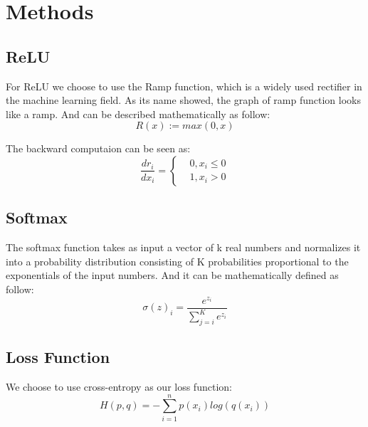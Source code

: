 \documentclass[12pt]{article}
\begin{document}
\section{Methods}
\subsection*{ReLU}
For ReLU we choose to use the Ramp function, which is a widely used rectifier in the machine 
learning field. As its name showed, the graph of ramp function looks like a ramp. And can be 
described mathematically as follow:
\begin{equation*}
    R(x):=max(0,x)
\end{equation*}

The backward computaion can be seen as:
\begin{equation*}
    \frac{dr_i}{dx_i}=\left\{
        \begin{aligned}
            &0, x_i\leq 0\\
            &1, x_i> 0
        \end{aligned}
    \right.
\end{equation*}

\subsection*{Softmax}
The softmax function takes as input a vector of k real numbers and normalizes it into a probability distribution consisting of K probabilities proportional to the exponentials of the input numbers.
And it can be mathematically defined as follow:
\begin{equation*}
    \sigma(z)_i = \frac{e^{z_i}}{\sum_{j=i}^K e^{z_i}}
\end{equation*}

\subsection*{Loss Function}
We choose to use cross-entropy as our loss function:
\begin{equation*}
    H(p,q) = -\sum_{i=1}^n p(x_i)log(q(x_i))
\end{equation*}
\end{document}
